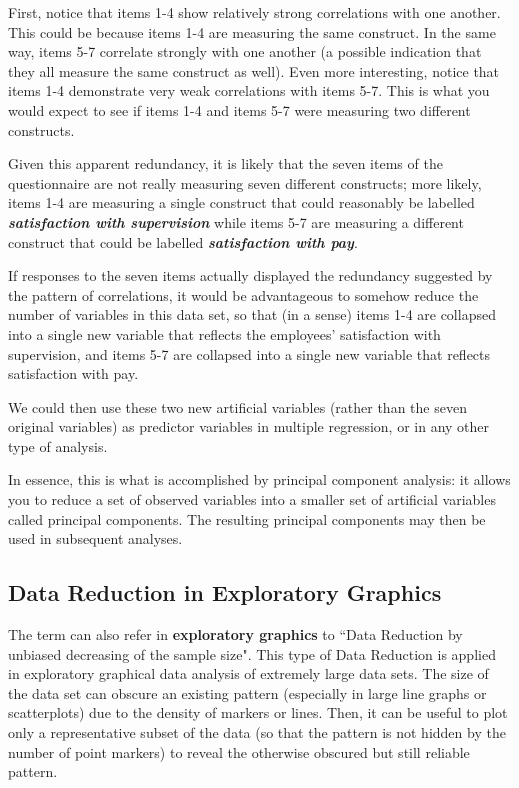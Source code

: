 \documentclass[a4paper,12pt]{article}
\begin{document}
First, notice that items 1-4 show relatively strong correlations with one another. This
could be because items 1-4 are measuring the same construct. In the same way, items 5-7
correlate strongly with one another (a possible indication that they all measure the same
construct as well). Even more interesting, notice that items 1-4 demonstrate very weak
correlations with items 5-7. This is what you would expect to see if items 1-4 and items 5-7
were measuring two different constructs.

Given this apparent redundancy, it is likely that the seven items of the questionnaire are not
really measuring seven different constructs; more likely, items 1-4 are measuring a single
construct that could reasonably be labelled \textbf{\emph{satisfaction with supervision}} while items 5-7 are
measuring a different construct that could be labelled \textbf{\emph{satisfaction with pay}}.

If responses to the seven items actually displayed the redundancy suggested by the pattern of
correlations, it would be advantageous to somehow reduce the number of variables
in this data set, so that (in a sense) items 1-4 are collapsed into a single new variable that reflects
the employees’ satisfaction with supervision, and items 5-7 are collapsed into a single new
variable that reflects satisfaction with pay.

We could then use these two new artificial variables (rather than the seven original variables) as predictor variables in multiple regression, or in any other type of analysis.

In essence, this is what is accomplished by principal component analysis: it allows you to reduce
a set of observed variables into a smaller set of artificial variables called principal components.
The resulting principal components may then be used in subsequent analyses.
\newpage
\subsection{Data Reduction in Exploratory Graphics}

The term can also refer in \textbf{exploratory graphics} to ``Data Reduction by unbiased decreasing of the sample size". This type of Data Reduction is applied in exploratory graphical data analysis of extremely large data sets. The size of the data set can obscure an existing pattern (especially in large line graphs or scatterplots) due to the density of markers or lines. Then, it can be useful to plot only a representative subset of the data (so that the pattern is not hidden by the number of point markers) to reveal the otherwise obscured but still reliable pattern.
\end{document}
